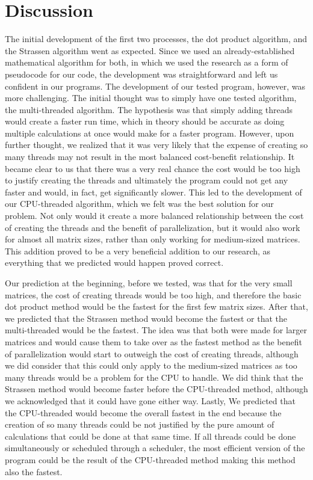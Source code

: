 \documentclass[conference]{IEEEtran}
\begin{document}
\section{Discussion}
    The initial development of the first two processes, the dot product algorithm, and the Strassen algorithm went as expected. Since we used an already-established mathematical algorithm for both, in which we used the research as a form of pseudocode for our code, the development was straightforward and left us confident in our programs. The development of our tested program, however, was more challenging. The initial thought was to simply have one tested algorithm, the multi-threaded algorithm. The hypothesis was that simply adding threads would create a faster run time, which in theory should be accurate as doing multiple calculations at once would make for a faster program. However, upon further thought, we realized that it was very likely that the expense of creating so many threads may not result in the most balanced cost-benefit relationship. It became clear to us that there was a very real chance the cost would be too high to justify creating the threads and ultimately the program could not get any faster and would, in fact, get significantly slower. This led to the development of our CPU-threaded algorithm, which we felt was the best solution for our problem. Not only would it create a more balanced relationship between the cost of creating the threads and the benefit of parallelization, but it would also work for almost all matrix sizes, rather than only working for medium-sized matrices. This addition proved to be a very beneficial addition to our research, as everything that we predicted would happen proved correct.

    Our prediction at the beginning, before we tested, was that for the very small matrices, the cost of creating threads would be too high, and therefore the basic dot product method would be the fastest for the first few matrix sizes. After that, we predicted that the Strassen method would become the fastest or that the multi-threaded would be the fastest. The idea was that both were made for larger matrices and would cause them to take over as the fastest method as the benefit of parallelization would start to outweigh the cost of creating threads, although we did consider that this could only apply to the medium-sized matrices as too many threads would be a problem for the CPU to handle. We did think that the Strassen method would become faster before the CPU-threaded method, although we acknowledged that it could have gone either way. Lastly, We predicted that the CPU-threaded would become the overall fastest in the end because the creation of so many threads could be not justified by the pure amount of calculations that could be done at that same time. If all threads could be done simultaneously or scheduled through a scheduler, the most efficient version of the program could be the result of the CPU-threaded method making this method also the fastest. 
    
\end{document}
